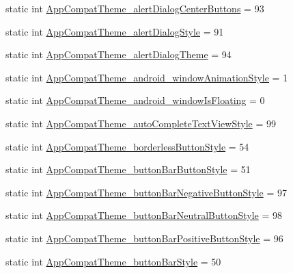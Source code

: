 \begin{DoxyCompactItemize}
\item 
static int \hyperlink{classandroid_1_1support_1_1v7_1_1appcompat_1_1R_1_1styleable_a3cc8519bf3de53533dfa7fdce1db7bc7}{App\+Compat\+Theme\+\_\+alert\+Dialog\+Center\+Buttons} = 93
\item 
static int \hyperlink{classandroid_1_1support_1_1v7_1_1appcompat_1_1R_1_1styleable_a543b853df6b700874bf0296f96f96e72}{App\+Compat\+Theme\+\_\+alert\+Dialog\+Style} = 91
\item 
static int \hyperlink{classandroid_1_1support_1_1v7_1_1appcompat_1_1R_1_1styleable_a5bc1ecd8175fad8bacd655f7fa16ed65}{App\+Compat\+Theme\+\_\+alert\+Dialog\+Theme} = 94
\item 
static int \hyperlink{classandroid_1_1support_1_1v7_1_1appcompat_1_1R_1_1styleable_a1c2effe7929579ca9cda625eea813fa8}{App\+Compat\+Theme\+\_\+android\+\_\+window\+Animation\+Style} = 1
\item 
static int \hyperlink{classandroid_1_1support_1_1v7_1_1appcompat_1_1R_1_1styleable_ad637edc116aeaf8ff24acde3e972dee9}{App\+Compat\+Theme\+\_\+android\+\_\+window\+Is\+Floating} = 0
\item 
static int \hyperlink{classandroid_1_1support_1_1v7_1_1appcompat_1_1R_1_1styleable_ad197292c918a85fb914e559e9992c78a}{App\+Compat\+Theme\+\_\+auto\+Complete\+Text\+View\+Style} = 99
\item 
static int \hyperlink{classandroid_1_1support_1_1v7_1_1appcompat_1_1R_1_1styleable_a0011ad8765746112dd3b16d0be2ae0dc}{App\+Compat\+Theme\+\_\+borderless\+Button\+Style} = 54
\item 
static int \hyperlink{classandroid_1_1support_1_1v7_1_1appcompat_1_1R_1_1styleable_a5a418303f6c9ee7dca64fc5e087c5d5d}{App\+Compat\+Theme\+\_\+button\+Bar\+Button\+Style} = 51
\item 
static int \hyperlink{classandroid_1_1support_1_1v7_1_1appcompat_1_1R_1_1styleable_a99db68caf8feef60226a106581b9314e}{App\+Compat\+Theme\+\_\+button\+Bar\+Negative\+Button\+Style} = 97
\item 
static int \hyperlink{classandroid_1_1support_1_1v7_1_1appcompat_1_1R_1_1styleable_aec02227eb23e237d76e41c93095e1acc}{App\+Compat\+Theme\+\_\+button\+Bar\+Neutral\+Button\+Style} = 98
\item 
static int \hyperlink{classandroid_1_1support_1_1v7_1_1appcompat_1_1R_1_1styleable_a5a97b06013106a661c91f3f55df6b4d0}{App\+Compat\+Theme\+\_\+button\+Bar\+Positive\+Button\+Style} = 96
\item 
static int \hyperlink{classandroid_1_1support_1_1v7_1_1appcompat_1_1R_1_1styleable_a5f507e4262ada8a443068f2d7537585f}{App\+Compat\+Theme\+\_\+button\+Bar\+Style} = 50

\end{DoxyCompactItemize}
